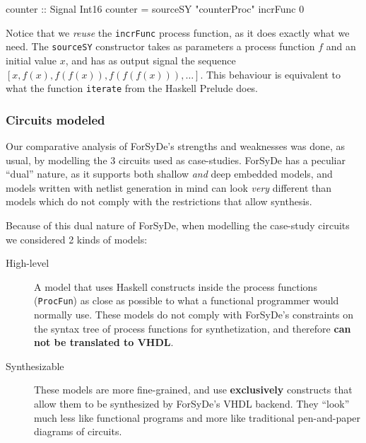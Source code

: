 \documentclass[a4paper]{article}
\begin{document}
                \begin{haskellcode}
        counter :: Signal Int16
        counter = sourceSY "counterProc" incrFunc 0
                \end{haskellcode}

                Notice that we \emph{reuse} the \texttt{incrFunc} process function, as it does
                exactly what we need. The \texttt{sourceSY} constructor takes as parameters a process
                function $f$ and an initial value $x$, and has as output signal the sequence
                $ [x, f(x), f(f(x)), f(f(f(x))), \ldots] $. This behaviour is equivalent to what the
                function \texttt{iterate} from the Haskell Prelude does.


            \subsubsection{Circuits modeled}
            \label{subsubsec:forsyde-circuits}
                Our comparative analysis of ForSyDe's strengths and weaknesses was done, as usual,
                by modelling the 3 circuits used as case-studies. ForSyDe has a peculiar ``dual''
                nature, as it supports both shallow \emph{and} deep embedded models, and models
                written with netlist generation in mind can look \emph{very} different than models
                which do not comply with the restrictions that allow synthesis.

                Because of this dual nature of ForSyDe, when modelling the case-study circuits
                we considered 2 kinds of models:

                \begin{description}
                    \item[High-level] A model that uses Haskell constructs inside the process
                        functions (\texttt{ProcFun}) as close as possible to what
                        a functional programmer would normally use. These models do not comply with
                        ForSyDe's constraints on the syntax tree of process functions for
                        synthetization, and therefore \textbf{can not be translated to VHDL}.

                    \item[Synthesizable] These models are more fine-grained, and use
                        \textbf{exclusively} constructs that allow them to be synthesized by
                        ForSyDe's VHDL backend. They ``look'' much less like functional programs and
                        more like traditional pen-and-paper diagrams of circuits.
                \end{description}
\end{document}
